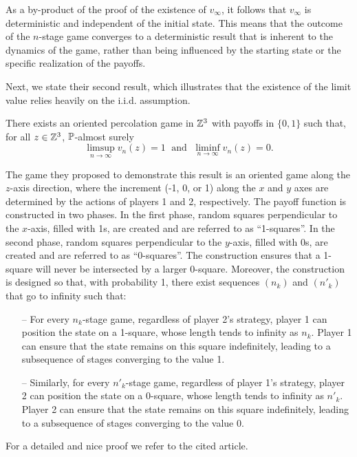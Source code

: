 	\begin{remark} 
		As a by-product of the proof of the existence of $v_{\infty}$, it follows that $v_{\infty}$ is deterministic and independent of the initial state. This means that the outcome of the $n$-stage game converges to a deterministic result that is inherent to the dynamics of the game, rather than being influenced by the starting state or the specific realization of the payoffs.
	\end{remark}

	Next, we state their second result, which illustrates that the existence of the limit value relies heavily on the i.i.d. assumption.

	 \begin{theorem}
	 	There exists an oriented percolation game in $\mathbb{Z}^3$ with payoffs in $\{0,1\}$ such that, for all $z \in \mathbb{Z}^3$, $\mathbb{P}$-almost surely 
	 	\[
	 		\limsup_{n \to \infty}v_n(z) = 1 \; \text{ and } \; \liminf_{n \to \infty}v_n(z) = 0. 
	 	\]
	 \end{theorem}

	The game they proposed to demonstrate this result is an oriented game along the $z$-axis direction, where the increment (-1, 0, or 1) along the $x$ and $y$ axes are determined by the actions of players 1 and 2, respectively. The payoff function is constructed in two phases. In the first phase, random squares perpendicular to the $x$-axis, filled with 1s, are created and are referred to as ``1-squares''. In the second phase, random squares perpendicular to the $y$-axis, filled with 0s, are created and are referred to as ``0-squares''. The construction ensures that a 1-square will never be intersected by a larger 0-square. Moreover, the construction is designed so that, with probability 1, there exist sequences $(n_{k})$ and $(n'_{k})$ that go to infinity such that:
	\begin{itemize} 
		\item[--] For every $n_{k}$-stage game, regardless of player 2's strategy, player 1 can position the state on a 1-square, whose length tends to infinity as $n_{k}$. Player 1 can ensure that the state remains on this square indefinitely, leading to a subsequence of stages converging to the value 1. 
		\item[--] Similarly, for every $n'_{k}$-stage game, regardless of player 1's strategy, player 2 can position the state on a 0-square, whose length tends to infinity as $n'_{k}$. Player 2 can ensure that the state remains on this square indefinitely, leading to a subsequence of stages converging to the value 0.
	\end{itemize}
	For a detailed and nice proof we refer to the cited article.

